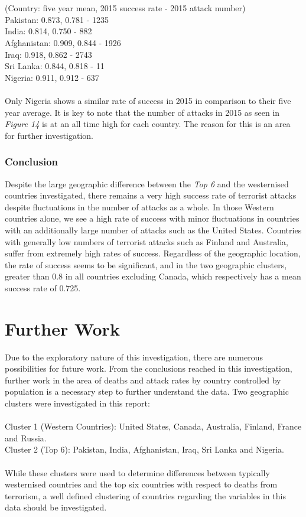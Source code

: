 \documentclass[10pt,a4paper]{article}
\begin{document}
\\\\
\indent \indent(Country: five year mean, 2015 success rate - 2015 attack number) \\
\indent Pakistan: 0.873,  0.781 - 1235  \\
\indent India: 0.814, 0.750 - 882 \\
\indent Afghanistan: 0.909, 0.844 - 1926 \\
\indent Iraq: 0.918, 0.862 - 2743 \\
\indent Sri Lanka: 0.844, 0.818 - 11 \\
\indent Nigeria: 0.911, 0.912 - 637 \\
\\
Only Nigeria shows a similar rate of success in 2015 in comparison to their five year average. It is key to note that the number of attacks in 2015 as seen in \textit{Figure 14} is at an all time high for each country. The reason for this is an area for further investigation.

\subsubsection{Conclusion}
Despite the large geographic difference between the \textit{Top 6} and the westernised countries investigated, there remains a very high success rate of terrorist attacks despite fluctuations in the number of attacks as a whole.
In those Western countries alone, we see a high rate of success with minor fluctuations in countries with an additionally large number of attacks such as the United States.
Countries with generally low numbers of terrorist attacks such as Finland and Australia, suffer from extremely high rates of success.
Regardless of the geographic location, the rate of success seems to be significant, and in the two geographic clusters, greater than 0.8 in all countries excluding Canada, which respectively has a mean success rate of 0.725.


\section{Further Work} 
Due to the exploratory nature of this investigation, there are numerous possibilities for future work.
From the conclusions reached in this investigation, further work in the area of deaths and attack rates by country controlled by population is a necessary step to further understand the data.
Two geographic clusters were investigated in this report:
\\\\
\indent Cluster 1 (Western Countries): United States, Canada, Australia, Finland, France and Russia. \\
\indent Cluster 2 (Top 6): Pakistan, India, Afghanistan, Iraq, Sri Lanka and Nigeria.
\\\\
While these clusters were used to determine differences between typically westernised countries and the top six countries with respect to deaths from terrorism, a well defined clustering of countries regarding the variables in this data should be investigated.
\end{document}
